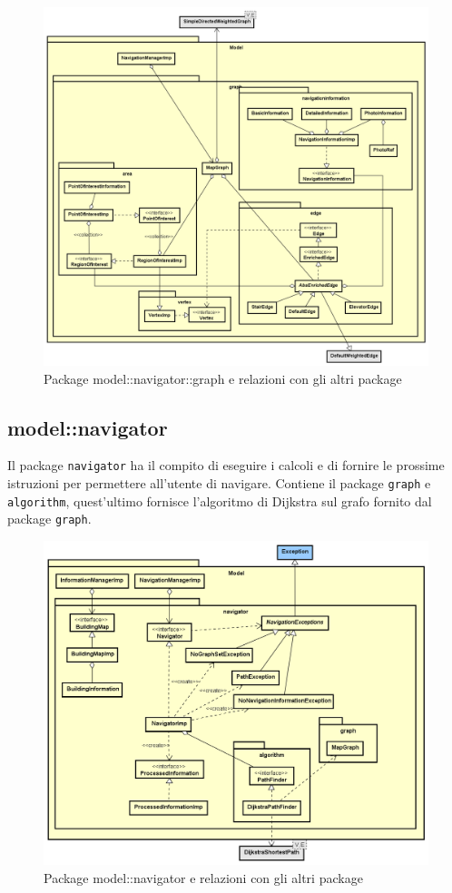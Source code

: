 \documentclass[../DefinizioneDiProdotto.tex,lanscape]{subfiles}
\begin{document}
\begin{figure}[h]
	\includegraphics[width=\textwidth]{img/RelationPackage/graph}
	\caption{Package model::navigator::graph e relazioni con gli altri package}
	\label{graphPackage}
\end{figure}


\newpage
	
	\subsection{model::navigator}
		Il package \verb|navigator| ha il compito di eseguire i calcoli e di fornire le prossime istruzioni per permettere all'utente di navigare. Contiene il package \verb|graph| e \verb|algorithm|, quest'ultimo fornisce l'algoritmo di Dijkstra sul grafo fornito dal package \verb|graph|.

\begin{figure}[h]
	\includegraphics[width=\textwidth]{img/RelationPackage/navigator}
	\caption{Package model::navigator e relazioni con gli altri package}
	\label{navigatorPackage}
\end{figure}
\end{document}
